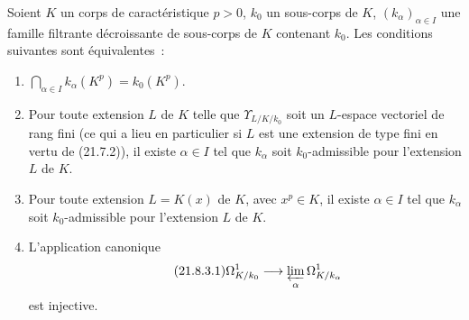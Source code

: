 \begin{theorem}[21.8.3]
\label{0.21.8.3-fr}
Soient $K$ un corps de caractéristique $p>0$, $k_0$ un sous-corps de $K$,
$(k_\alpha)_{\alpha\in I}$ une famille filtrante décroissante de sous-corps
de $K$ contenant $k_0$. Les conditions suivantes sont équivalentes~:
\begin{enumerate}
  \item[\rm a)] $\bigcap_{\alpha\in I}k_\alpha(K^p)=k_0(K^p)$.
  \item[\rm b)] Pour toute extension $L$ de $K$ telle que
  $\Upsilon_{L/K/k_0}$ soit un $L$-espace vectoriel de rang fini
  \textup{(}ce qui a lieu en particulier si $L$ est une extension de type fini en
  vertu de \textup{(21.7.2))}, il existe $\alpha\in I$ tel que $k_\alpha$ soit
  $k_0$-admissible pour l'extension $L$ de $K$.
  \item[\rm b$'$)] Pour toute extension $L=K(x)$ de $K$, avec $x^p\in K$,
  il existe $\alpha\in I$ tel que $k_\alpha$ soit $k_0$-admissible pour
  l'extension $L$ de $K$.
  \item[\rm c)] L'application canonique
\begin{equation}
\tag{21.8.3.1}
\label{0.21.8.3.1-fr}
\Omega^1_{K/k_0}\longrightarrow\varprojlim_{\alpha}\Omega^1_{K/k_\alpha}
\end{equation}
est injective.
\end{enumerate}
\end{theorem}

